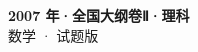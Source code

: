\documentclass[zihao=-4, a4paper]{ctexart}
\begin{document}
\begin{center}
  {\Large\bfseries 2007 年·全国大纲卷Ⅱ·理科}\\[4pt]
  {\large 数学 · 试题版}
\end{center}
\medskip
{}

\end{document}
